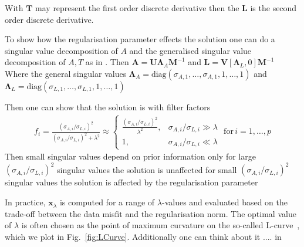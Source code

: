 With $\bm{T}$ may represent the first order discrete  derivative then the $\bm{L}$ is the second order discrete derivative.

To show how the regularisation parameter effects the solution one can do a singular value decomposition of $A$
and the generalised singular value decomposition of $A, T$ as in \cite{hansen1989GSVD}.
Then $\bm{A} = \bm{U} \bm{\Lambda}_A \bm{M}^{-1}$ and $\bm{L} = \bm{V} [\bm{\Lambda}_L,0] \bm{M}^{-1} $
Where the general singular values $\bm{\Lambda}_A = \text{diag}(\sigma_{A,1},\dots,\sigma_{A,1},1,\dots,1)$ and $\bm{\Lambda}_L = \text{diag}(\sigma_{L,1},\dots,\sigma_{L,1},1,\dots,1)$

Then one can show that the solution is %
with filter factors
\begin{align}
	f_i = \frac{(\sigma_{A,i}/\sigma_{L,i})^2 }{(\sigma_{A,i}/\sigma_{L,i})^2 + \lambda^2} \approx
	\begin{cases}
		\frac{(\sigma_{A,i}/\sigma_{L,i})^2}{ \lambda^2},  & \sigma_{A,i}/\sigma_{L,i} \gg \lambda\\
				1 ,  & \sigma_{A,i}/\sigma_{L,i} \ll \lambda 
	\end{cases}
\, \, \text{for}\, i= 1,\dots,p
\end{align}
Then small singular values depend on prior information only
for large $(\sigma_{A,i}/\sigma_{L,i})^2$ singular values the solution is unaffected
for small $(\sigma_{A,i}/\sigma_{L,i})^2$ singular values the solution is affected by the regularisation parameter



In practice, $\bm{x}_{\lambda}$ is computed for a range of $\lambda$-values and evaluated based on the trade-off between the data misfit and the regularisation norm. The optimal value of $\lambda$ is often chosen as the point of maximum curvature on the so-called L-curve~\cite{hansen1993use}, which we plot in Fig.~\ref{fig:LCurve}.
Additionally one can think about it .... in \cite{fox2016fast}
\cite[Fig. 2.13]{SANTOSH202265}

